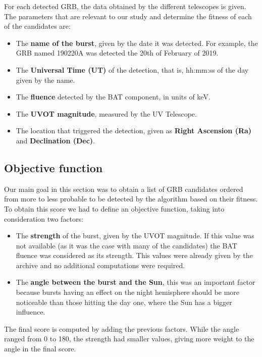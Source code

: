 For each detected GRB, the data obtained by the different telescopes is given. The parameters that are relevant to our study and determine the fitness of each of the candidates are:

\begin{itemize}
	\item The \textbf{name of the burst}, given by the date it was detected. For example, the GRB named 190220A was detected the 20th of February of 2019.
	\item The \textbf{Universal Time (UT)} of the detection, that is, hh:mm:ss of the day given by the name.
	\item The \textbf{fluence} detected by the BAT component, in units of keV.
	\item The \textbf{UVOT magnitude}, measured by the UV Telescope.
	\item The location that triggered the detection, given as \textbf{Right Ascension (Ra)} and \textbf{Declination (Dec)}.
\end{itemize}

\subsection{Objective function}

Our main goal in this section was to obtain a list of GRB candidates ordered from more to less probable to be detected by the algorithm based on their fitness. To obtain this score we had to define an objective function, taking into consideration two factors:

\begin{itemize}
	
	\item The \textbf{strength} of the burst, given by the UVOT magnitude. If this value was not available (as it was the case with many of the candidates) the BAT fluence was considered as its strength. This values were already given by the archive and no additional computations were required.
	
	\item The \textbf{angle between the burst and the Sun}, this was an important factor because bursts having an effect on the night hemisphere should be more noticeable than those hitting the day one, where the Sun has a bigger influence.
	
\end{itemize}

The final score is computed by adding the previous factors. While the angle ranged from 0 to 180, the strength had smaller values, giving more weight to the angle in the final score.

